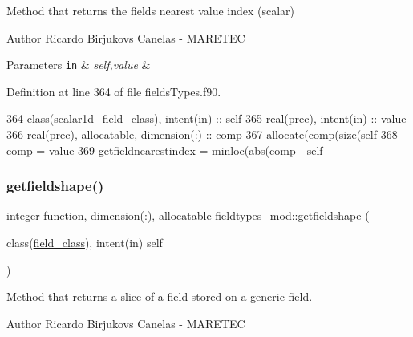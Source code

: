 Method that returns the field\textquotesingle{}s nearest value index (scalar) 

\begin{DoxyAuthor}{Author}
Ricardo Birjukovs Canelas -\/ M\+A\+R\+E\+T\+EC 
\end{DoxyAuthor}

\begin{DoxyParams}[1]{Parameters}
\mbox{\tt in}  & {\em self,value} & \\
\hline
\end{DoxyParams}


Definition at line 364 of file fields\+Types.\+f90.


\begin{DoxyCode}
364     \textcolor{keywordtype}{class}(scalar1d\_field\_class), \textcolor{keywordtype}{intent(in)} :: self
365     \textcolor{keywordtype}{real(prec)}, \textcolor{keywordtype}{intent(in)} :: value
366     \textcolor{keywordtype}{real(prec)}, \textcolor{keywordtype}{allocatable}, \textcolor{keywordtype}{dimension(:)} :: comp
367     \textcolor{keyword}{allocate}(comp(\textcolor{keyword}{size}(self%
368     comp = \textcolor{keywordtype}{value}
369     getfieldnearestindex = minloc(abs(comp - self%
\end{DoxyCode}
\mbox{\label{namespacefieldtypes__mod_ab8a0fa52771fc81b6f8a39cbb9ad2c34}} 
\subsubsection{\texorpdfstring{getfieldshape()}{getfieldshape()}}
{\footnotesize\ttfamily integer function, dimension(\+:), allocatable fieldtypes\+\_\+mod\+::getfieldshape (\begin{DoxyParamCaption}\item[{class(\mbox{\hyperlink{structfieldtypes__mod_1_1field__class}{field\+\_\+class}}), intent(in)}]{self }\end{DoxyParamCaption})\hspace{0.3cm}{\ttfamily [private]}}



Method that returns a slice of a field stored on a generic field. 

\begin{DoxyAuthor}{Author}
Ricardo Birjukovs Canelas -\/ M\+A\+R\+E\+T\+EC 
\end{DoxyAuthor}


